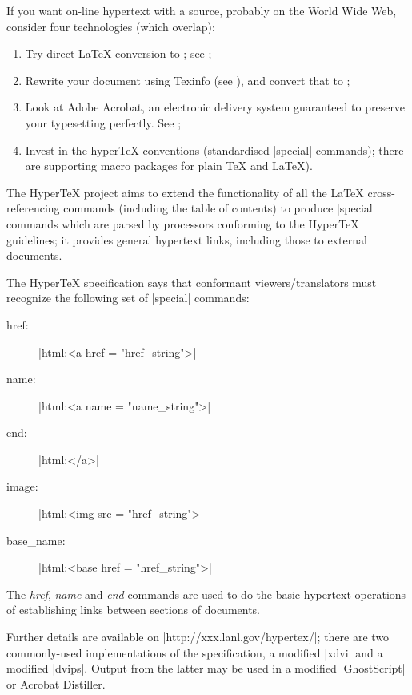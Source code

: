 
If you want on-line hypertext with a \AllTeX{} source, probably on the
World Wide Web, consider four technologies (which overlap):
\begin{enumerate}
\item Try direct \LaTeX{} conversion to ; see
  ;
\item Rewrite your document using Texinfo
  (see ), and
  convert that to ;
\item Look at Adobe Acrobat, an electronic delivery system guaranteed
  to preserve your typesetting perfectly.
  See ;
\item Invest in the hyper\TeX{} conventions (standardised \cs|special|
  commands); there are supporting macro packages for plain \TeX{} and
  \LaTeX{}).
\end{enumerate}

The Hyper\TeX{} project aims to extend the functionality of all the
\LaTeX{} cross-referencing commands (including the table of contents)
to produce \cs|special| commands which are parsed by  processors
conforming to the Hyper\TeX{} guidelines;
it provides general hypertext links, including those
to external documents.

The Hyper\TeX{} specification says that conformant viewers/translators
must recognize the following set of \cs|special| commands:
\begin{description}
\item[href:] |html:<a href = "href_string">|
\item[name:] |html:<a name = "name_string">|
\item[end:] |html:</a>|
\item[image:] |html:<img src = "href_string">|
\item[base\_name:] |html:<base href = "href_string">|
\end{description}

The \emph{href}, \emph{name} and \emph{end} commands are used to do
the basic hypertext operations of establishing links between sections
of documents. 

Further details are available on \URL|http://xxx.lanl.gov/hypertex/|; there
are two commonly-used implementations of the specification, a
modified  \ProgName|xdvi| and a modified \ProgName|dvips|. Output from the
latter may be used in a modified \ProgName|GhostScript| or Acrobat Distiller.

